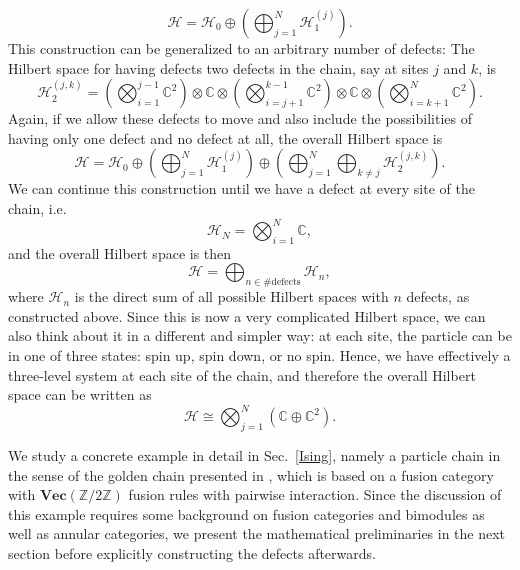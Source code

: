 \documentclass[aps,prx,twocolumn,superscriptaddress,noshowkeys]{revtex4-2}  %
\renewcommand{\Vec}{\textbf{Vec}}
\newcommand{\Z}{\mathbb{Z}}
\theoremstyle{plain}%
\theoremstyle{definition}
\theoremstyle{remark}
\begin{document}
\begin{equation}
\mathcal{H}=\mathcal{H}_0\oplus\left(\bigoplus_{j=1}^N\mathcal{H}_1^{(j)}\right).
\end{equation}
This construction can be generalized to an arbitrary number of defects: The Hilbert space for having defects two defects in the chain, say at sites $j$ and $k$, is 
\begin{equation}
\mathcal{H}_2^{(j,k)}=\left(\bigotimes_{i=1}^{j-1}\mathbb{C}^2\right)\otimes\mathbb{C}\otimes\left(\bigotimes_{i=j+1}^{k-1}\mathbb{C}^2\right)\otimes\mathbb{C}\otimes\left(\bigotimes_{i=k+1}^{N}\mathbb{C}^2\right).
\end{equation}
Again, if we allow these defects to move and also include the possibilities of having only one defect and no defect at all, the overall Hilbert space is
\begin{equation}
\mathcal{H}=\mathcal{H}_0\oplus\left(\bigoplus_{j=1}^N\mathcal{H}_1^{(j)}\right)\oplus\left(\bigoplus_{j=1}^N\bigoplus_{k\neq j}\mathcal{H}_2^{(j,k)}\right).
\end{equation}
We can continue this construction until we have a defect at every site of the chain, i.e.
\begin{equation}
\mathcal{H}_N=\bigotimes_{i=1}^N\mathbb{C},
\end{equation}
and the overall Hilbert space is then
\begin{equation}
\mathcal{H}=\bigoplus_{n\in\#\mathrm{defects}}\mathcal{H}_n,
\end{equation}
where $\mathcal{H}_n$ is the direct sum of all possible Hilbert spaces with $n$ defects, as constructed above. Since this is now a very complicated Hilbert space, we can also think about it in a different and simpler way: at each site, the particle can be in one of three states: spin up, spin down, or no spin. Hence, we have effectively a three-level system at each site of the chain, and therefore the overall Hilbert space can be written as
\begin{equation}
\mathcal{H}\cong\bigotimes_{j=1}^N\left(\mathbb{C}\oplus\mathbb{C}^2\right).
\end{equation}

We study a concrete example in detail in Sec.~\ref{Ising}, namely a particle chain in the sense of the golden chain presented in \cite{Feiguin2007}, which is based on a fusion category with $\Vec(\Z/2\Z)$ fusion rules with pairwise interaction. Since the discussion of this example requires some background on fusion categories and bimodules as well as annular categories, we present the mathematical preliminaries in the next section before explicitly constructing the defects afterwards.
\end{document}

